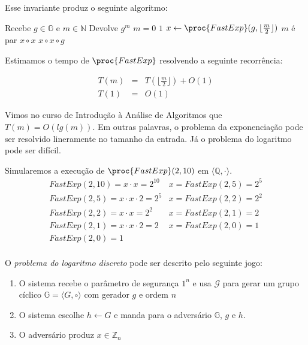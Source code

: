 Esse invariante produz o seguinte algoritmo:
\begin{codebox}
\li \Comment Recebe $g \in \mathbb{G}$ e $m \in \mathbb{N}$
\li \Comment Devolve $g^m$
\li \If $m = 0 $
\li \Then \Return $1$
\End
\li $x \gets \proc{FastExp}(g, \lfloor \frac{m}{2} \rfloor)$
\li \If $m$ é par
\li \Then \Return $x \circ x$
\li \Else \Return $x \circ x \circ g$
\End
\end{codebox}


Estimamos o tempo de $\proc{FastExp}$ resolvendo a seguinte recorrência:

\begin{eqnarray*}
  T(m) & = & T(\lfloor \frac{m}{2} \rfloor) + O(1)\\
  T(1) & = & O(1)
\end{eqnarray*}

Vimos no curso de Introdução à Análise de Algoritmos que $T(m) = O(lg(m))$.
Em outras palavras, o problema da exponenciação pode ser resolvido lineramente no tamanho da entrada.
Já o problema do logaritmo pode ser difícil.

\begin{example}
  Simularemos a execução de $\proc{FastExp}(2, 10)$ em $\langle \mathbb{Q}, \cdot \rangle$.
\begin{displaymath}
  \begin{array}{ll}
    FastExp(2, 10) = x \cdot x = 2^{10} & x = FastExp(2, 5) = 2^5 \\
    FastExp(2, 5)  = x \cdot x \cdot 2 = 2^5 & x = FastExp(2, 2) = 2^2\\
    FastExp(2, 2)  = x \cdot x = 2^2 & x = FastExp(2, 1) = 2\\
    FastExp(2, 1)  = x \cdot x \cdot 2 = 2 & x = FastExp(2, 0) = 1\\
    FastExp(2, 0)  = 1 \\
  \end{array}
\end{displaymath}
\end{example}

O {\em problema do logaritmo discreto} pode ser descrito pelo seguinte jogo:
\begin{enumerate}
\item O sistema recebe o parâmetro de segurança $1^n$ e usa $\mathcal{G}$ para gerar um grupo cíclico $\mathbb{G} = \langle G, \circ \rangle$ com gerador $g$ e ordem $n$
\item O sistema escolhe $h \leftarrow G$ e manda para o adversário $\mathbb{G}$, $g$ e $h$.
\item O adversário produz $x \in \mathbb{Z}_n$
\end{enumerate}

